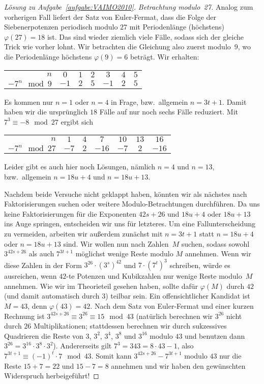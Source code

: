 \begin{proof}[Lösung zu Aufgabe~\ref{aufgabe:VAIMO2010}]
	
	\emph{Betrachtung modulo~27.} Analog zum vorherigen Fall liefert der Satz von Euler-Fermat, dass die Folge der Siebenerpotenzen periodisch modulo $27$ mit Periodenlänge (höchstens) $\varphi(27)=18$ ist. Das sind wieder ziemlich viele Fälle, sodass sich der gleiche Trick wie vorher lohnt. Wir betrachten die Gleichung also zuerst modulo~$9$, wo die Periodenlänge höchstens $\varphi(9)=6$ beträgt. Wir erhalten:
	\begin{center}
		\begin{tabular}{r | c c c c c c}\toprule
			$n$ & $0$ & $1$ & $2$ & $3$ & $4$ & $5$ \\%
			$-7^n\mod 9$ & $-1$ & $2$ & $5$ & $-1$ & $2$ & $5$\\\bottomrule
		\end{tabular}
	\end{center}
	Es kommen nur $n=1$ oder $n=4$ in Frage, bzw.\ allgemein $n=3t+1$. Damit haben wir die ursprünglich $18$ Fälle auf nur noch sechs Fälle reduziert. Mit $7^3\equiv -8\mod 27$ ergibt sich
	\begin{center}
		\begin{tabular}{r | c c c c c c}\toprule
			$n$ & $1$ & $4$ & $7$ & $10$ & $13$ & $16$ \\%
			$-7^n\mod 27$ & $-7$ & $2$ & $-16$ & $-7$ & $2$ & $-16$\\\bottomrule
		\end{tabular}
	\end{center}
	Leider gibt es auch hier noch Lösungen, nämlich $n=4$ und $n=13$, bzw.\ allgemein $n=18u+4$ und $n=18u+13$.
	
	Nachdem beide Versuche nicht geklappt haben, könnten wir als nächstes nach Faktorisierungen suchen oder weitere Modulo-Betrachtungen durchführen. Da uns keine Faktorisierungen für die Exponenten $42s+26$ und $18u+4$ oder $18u+13$ ins Auge springen, entscheiden wir uns für letzteres. Um eine Fallunterscheidung zu vermeiden, arbeiten wir außerdem zunächst mit $n=3t+1$ statt $n=18u+4$ oder $n=18u+13$ sind. Wir wollen nun nach Zahlen~$M$ suchen, sodass sowohl $3^{42s+26}$ als auch $7^{3t+1}$ möglichst wenige Reste modulo $M$ annehmen. Wenn wir diese Zahlen in der Form $3^{26}\cdot (3^s)^{42}$ und $7\cdot (7^t)^3$ schreiben, würde es ausreichen, wenn $42$-te Potenzen und Kubikzahlen nur wenige Reste modulo~$M$ annehmen. Wie wir im Theorieteil gesehen haben, sollte dafür $\varphi(M)$ durch $42$ (und damit automatisch durch $3$) teilbar sein. Ein offensichtlicher Kandidat ist $M=43$, denn $\varphi(43)=42$. Nach dem Satz von Euler-Fermat und einer kurzen Rechnung ist $3^{42s+26}\equiv 3^{26}\equiv 15\mod 43$ (natürlich berechnen wir $3^{26}$ nicht durch $26$ Multiplikationen; stattdessen berechnen wir durch sukzessives Quadrieren die Reste von $3$, $3^2$, $3^4$, $3^8$ und $3^{16}$ modulo $43$ und benutzen dann $3^{26}=3^{16}\cdot 3^8\cdot 3^2$). Andererseits gilt $7^3=343=8\cdot 43-1$, also $7^{3t+1}\equiv (-1)^t\cdot 7\mod 43$. Somit kann $3^{42s+26}-7^{3t+1}$ modulo $43$ nur die Reste $15+7=22$ und $15-7=8$ annehmen und wir haben den gewünschten Widerspruch herbeigeführt!
\end{proof}